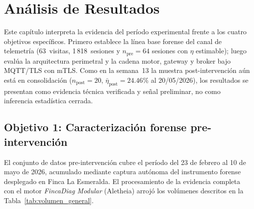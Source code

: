 \chapter{Análisis de Resultados}
\label{chapter:chapter06}
Este capítulo interpreta la evidencia del período experimental frente a los cuatro objetivos específicos. Primero establece la línea base forense del canal de telemetría (63~visitas, 1\,818~sesiones y $n_{\text{pre}}=64$ sesiones con $\eta$ estimable); luego evalúa la arquitectura perimetral y la cadena motor, gateway y broker bajo MQTT/TLS con mTLS. Como en la semana~13 la muestra post-intervención aún está en consolidación ($n_{\text{post}}=20$, $\bar{\eta}_{\text{post}}=24.46\%$ al 20/05/2026), los resultados se presentan como evidencia técnica verificada y señal preliminar, no como inferencia estadística cerrada.


\section{Objetivo 1: Caracterización forense pre-intervención}
\label{sec:obj1-resultados}

El conjunto de datos pre-intervención cubre el período del 23 de febrero al 10 de mayo de 2026, acumulado mediante captura autónoma del instrumento forense desplegado en Finca La Esmeralda. El procesamiento de la evidencia completa con el motor \textit{FincaDiag Modular} (Aletheia) arrojó los volúmenes descritos en la Tabla~\ref{tab:volumen_general}.

\begin{table}[H]
\centering
\caption{Volumen general del conjunto de datos pre-intervención.}
\label{tab:volumen_general}
\scriptsize
\renewcommand{\arraystretch}{1.27}
\end{table}

